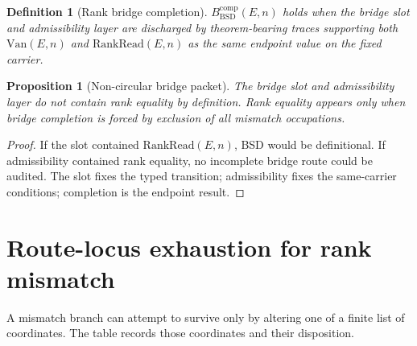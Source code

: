 \documentclass[11pt]{article}
\newtheorem{proposition}[theorem]{Proposition}
\newtheorem{definition}[theorem]{Definition}
\newcommand{\BSD}{\mathrm{BSD}}
\newcommand{\Van}{\mathrm{Van}}
\newcommand{\RankRead}{\mathrm{RankRead}}
\newcommand{\comp}{\mathrm{comp}}
\begin{document}
\begin{definition}[Rank bridge completion]
$B^{\comp}_{\BSD}(E,n)$ holds when the bridge slot and admissibility layer are discharged by theorem-bearing traces supporting both $\Van(E,n)$ and $\RankRead(E,n)$ as the same endpoint value on the fixed carrier.
\end{definition}

\begin{proposition}[Non-circular bridge packet]
The bridge slot and admissibility layer do not contain rank equality by definition. Rank equality appears only when bridge completion is forced by exclusion of all mismatch occupations.
\end{proposition}

\begin{proof}
If the slot contained $\RankRead(E,n)$, BSD would be definitional. If admissibility contained rank equality, no incomplete bridge route could be audited. The slot fixes the typed transition; admissibility fixes the same-carrier conditions; completion is the endpoint result.
\end{proof}

\section{Route-locus exhaustion for rank mismatch}

A mismatch branch can attempt to survive only by altering one of a finite list of coordinates. The table records those coordinates and their disposition.
\end{document}
